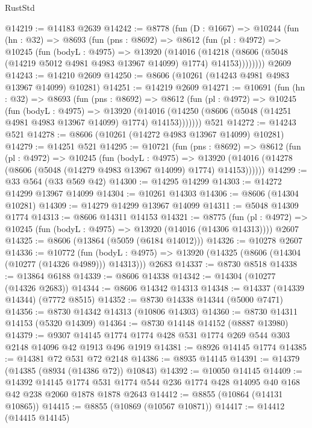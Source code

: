 \begin{lexlean}{RustStd}
\begin{coremodule}
@14219 := @14183 @2639
@14242 := @8778
    (fun (D : @1667) =>
    @10244
      (fun (hn : @32) =>
      @8693
        (fun (pns : @8692) =>
        @8612
          (fun (pl : @4972) =>
          @10245
            (fun (bodyL : @4975) =>
            @13920
              (@14016
                (@14218 (@8606 (@5048 (@14219 @5012 @4981 @4983 @13967 @14099) @1774) @14153))))))))
    @2609
@14243 := @14210 @2609
@14250 := @8606 (@10261 (@14243 @4981 @4983 @13967 @14099) @10281)
@14251 := @14219 @2609
@14271 := @10691
    (fun (hn : @32) =>
    @8693
      (fun (pns : @8692) =>
      @8612
        (fun (pl : @4972) =>
        @10245
          (fun (bodyL : @4975) =>
          @13920
            (@14016 (@14250 (@8606 (@5048 (@14251 @4981 @4983 @13967 @14099) @1774) @14153)))))))
    @521
@14272 := @14243 @521
@14278 := @8606 (@10261 (@14272 @4983 @13967 @14099) @10281)
@14279 := @14251 @521
@14295 := @10721
    (fun (pns : @8692) =>
    @8612
      (fun (pl : @4972) =>
      @10245
        (fun (bodyL : @4975) =>
        @13920 (@14016 (@14278 (@8606 (@5048 (@14279 @4983 @13967 @14099) @1774) @14153))))))
@14299 := @33 @564 (@33 @569 @42)
@14300 := @14295 @14299
@14303 := @14272 @14299 @13967 @14099
@14304 := @10261 @14303
@14306 := @8606 (@14304 @10281)
@14309 := @14279 @14299 @13967 @14099
@14311 := @5048 @14309 @1774
@14313 := @8606 @14311 @14153
@14321 := @8775
    (fun (pl : @4972) => @10245 (fun (bodyL : @4975) => @13920 (@14016 (@14306 @14313))))
    @2607
@14325 := @8606 (@13864 (@5059 (@6184 @14012)))
@14326 := @10278 @2607
@14336 := @10772
    (fun (bodyL : @4975) => @13920 (@14325 (@8606 (@14304 (@10277 (@14326 @4989))) @14313)))
    @2683
@14337 := @8730 @8518
@14338 := @13864 @6188
@14339 := @8606 @14338
@14342 := @14304 (@10277 (@14326 @2683))
@14344 := @8606 @14342 @14313
@14348 := @14337 (@14339 @14344) (@7772 @8515)
@14352 := @8730 @14338 @14344 (@5000 @7471)
@14356 := @8730 @14342 @14313 (@10806 @14303)
@14360 := @8730 @14311 @14153 (@5320 @14309)
@14364 := @8730 @14148 @14152 (@8887 @13980)
@14379 := @9307 @14145 @1774 @1774 @428 @531 @1774 @269 @544 @303 @2148 @14096 @42 @1913 @496 @1919
@14381 := @8926 @14145 @1774
@14385 := @14381 @72 @531 @72 @2148
@14386 := @8935 @14145
@14391 := @14379 (@14385 (@8934 (@14386 @72)) @10843)
@14392 := @10050 @14145
@14409 := @14392
    @14145
    @1774
    @531
    @1774
    @544
    @236
    @1774
    @428
    @14095
    @40
    @168
    @42
    @238
    @2060
    @1878
    @1878
    @2643
@14412 := @8855 (@10864 (@14131 @10865))
@14415 := @8855 (@10869 (@10567 @10871))
@14417 := @14412 (@14415 @14145)

\end{coremodule}
\end{lexlean}
